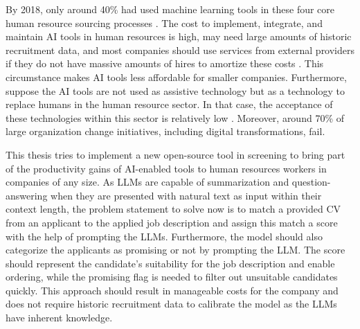 \documentclass[draft,final]{thesisclass} %
\begin{document}
By 2018, only around 40\% had used machine learning tools in these four core human resource sourcing processes \parencite[4]{ai_recruiting}.
The cost to implement, integrate, and maintain \acs{AI} tools in human resources is high, may need large amounts of historic recruitment data, and most companies should use services from external providers if they do not have massive amounts of hires to amortize these costs \parencite[8]{ai_recruiting}.
This circumstance makes \acs{AI} tools less affordable for smaller companies.
Furthermore, suppose the \acs{AI} tools are not used as assistive technology but as a technology to replace humans in the human resource sector. In that case, the acceptance of these technologies within this sector is relatively low \parencite[9]{ai_recruiting}.
Moreover, around 70\% of large organization change initiatives, including digital transformations, fail.

This thesis tries to implement a new open-source tool in screening to bring part of the productivity gains of \acs{AI}-enabled tools to human resources workers in companies of any size.
As \acs{LLM}s are capable of summarization and question-answering when they are presented with natural text as input within their context length, the problem statement to solve now is to match a provided \acs{CV} from an applicant to the applied job description and assign this match a score with the help of prompting the \acs{LLM}s.
Furthermore, the model should also categorize the applicants as promising or not by prompting the \acs{LLM}.
The score should represent the candidate's suitability for the job description and enable ordering, while the promising flag is needed to filter out unsuitable candidates quickly.
This approach should result in manageable costs for the company and does not require historic recruitment data to calibrate the model as the \acs{LLM}s have inherent knowledge.
\end{document}
